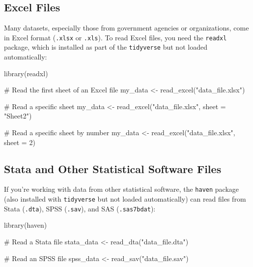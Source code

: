 \documentclass[
  letterpaper,
  DIV=11,
  numbers=noendperiod]{scrreprt}
\newenvironment{Shaded}{\begin{snugshade}}{\end{snugshade}}
\newcommand{\AttributeTok}[1]{\textcolor[rgb]{0.40,0.45,0.13}{#1}}
\newcommand{\CommentTok}[1]{\textcolor[rgb]{0.37,0.37,0.37}{#1}}
\newcommand{\DecValTok}[1]{\textcolor[rgb]{0.68,0.00,0.00}{#1}}
\newcommand{\FunctionTok}[1]{\textcolor[rgb]{0.28,0.35,0.67}{#1}}
\newcommand{\NormalTok}[1]{\textcolor[rgb]{0.00,0.23,0.31}{#1}}
\newcommand{\OtherTok}[1]{\textcolor[rgb]{0.00,0.23,0.31}{#1}}
\newcommand{\StringTok}[1]{\textcolor[rgb]{0.13,0.47,0.30}{#1}}
\begin{document}
\subsection{Excel Files}\label{excel-files}

Many datasets, especially those from government agencies or
organizations, come in Excel format (\texttt{.xlsx} or \texttt{.xls}).
To read Excel files, you need the \texttt{readxl} package, which is
installed as part of the \texttt{tidyverse} but not loaded
automatically:

\begin{Shaded}
\begin{Highlighting}[]
\FunctionTok{library}\NormalTok{(readxl)}

\CommentTok{\# Read the first sheet of an Excel file}
\NormalTok{my\_data }\OtherTok{\textless{}{-}} \FunctionTok{read\_excel}\NormalTok{(}\StringTok{"data\_file.xlsx"}\NormalTok{)}

\CommentTok{\# Read a specific sheet}
\NormalTok{my\_data }\OtherTok{\textless{}{-}} \FunctionTok{read\_excel}\NormalTok{(}\StringTok{"data\_file.xlsx"}\NormalTok{, }\AttributeTok{sheet =} \StringTok{"Sheet2"}\NormalTok{)}

\CommentTok{\# Read a specific sheet by number}
\NormalTok{my\_data }\OtherTok{\textless{}{-}} \FunctionTok{read\_excel}\NormalTok{(}\StringTok{"data\_file.xlsx"}\NormalTok{, }\AttributeTok{sheet =} \DecValTok{2}\NormalTok{)}
\end{Highlighting}
\end{Shaded}

\subsection{Stata and Other Statistical Software
Files}\label{stata-and-other-statistical-software-files}

If you're working with data from other statistical software, the
\texttt{haven} package (also installed with \texttt{tidyverse} but not
loaded automatically) can read files from Stata (\texttt{.dta}), SPSS
(\texttt{.sav}), and SAS (\texttt{.sas7bdat}):

\begin{Shaded}
\begin{Highlighting}[]
\FunctionTok{library}\NormalTok{(haven)}

\CommentTok{\# Read a Stata file}
\NormalTok{stata\_data }\OtherTok{\textless{}{-}} \FunctionTok{read\_dta}\NormalTok{(}\StringTok{"data\_file.dta"}\NormalTok{)}

\CommentTok{\# Read an SPSS file}
\NormalTok{spss\_data }\OtherTok{\textless{}{-}} \FunctionTok{read\_sav}\NormalTok{(}\StringTok{"data\_file.sav"}\NormalTok{)}
\end{Highlighting}
\end{Shaded}
\end{document}
